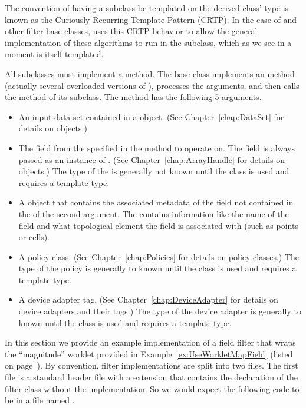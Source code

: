 \begin{didyouknow}
  The convention of having a subclass be templated on the derived class' type is known as the Curiously Recurring Template Pattern (CRTP).
  In the case of  and other filter base classes, \VTKm uses this CRTP behavior to allow the general implementation of these algorithms to run  in the subclass, which as we see in a moment is itself templated.
\end{didyouknow}

All  subclasses must implement a  method.
The  base class implements an  method (actually several overloaded versions of ), processes the arguments, and then calls the  method of its subclass.
The  method has the following 5 arguments.
\begin{itemize}
\item
  An input data set contained in a  object.
  (See Chapter~\ref{chap:DataSet} for details on  objects.)
\item
  The field from the  specified in the  method to operate on.
  The field is always passed as an instance of .
  (See Chapter~\ref{chap:ArrayHandle} for details on  objects.)
  The type of the  is generally not known until the class is used and requires a template type.
\item
  A  object that contains the associated metadata of the field not contained in the  of the second argument.
  The  contains information like the name of the field and what topological element the field is associated with (such as points or cells).
\item
  A policy class.
  (See Chapter~\ref{chap:Policies} for details on policy classes.)
  The type of the policy is generally to known until the class is used and requires a template type.
\item
  A device adapter tag.
  (See Chapter~\ref{chap:DeviceAdapter} for details on device adapters and their tags.)
  The type of the device adapter is generally to known until the class is used and requires a template type.
\end{itemize}

In this section we provide an example implementation of a field filter that wraps the ``magnitude'' worklet provided in Example~\ref{ex:UseWorkletMapField} (listed on page~\pageref{ex:UseWorkletMapField}).
By convention, filter implementations are split into two files.
The first file is a standard header file with a  extension that contains the declaration of the filter class without the implementation.
So we would expect the following code to be in a file named .

